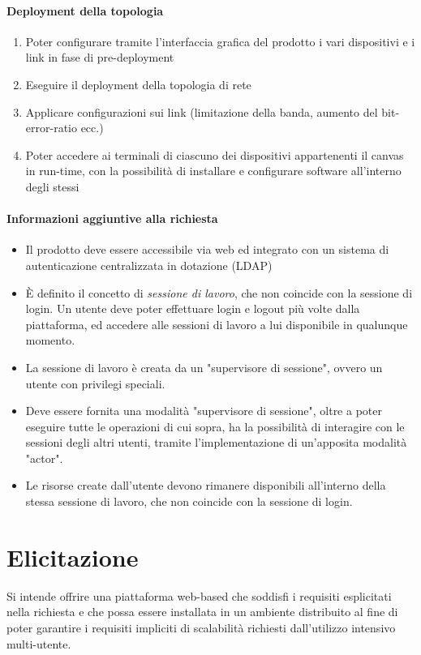 \documentclass[../main.tex]{subfiles}
\begin{document}
\paragraph{Deployment della topologia}
\begin{enumerate}
    \item Poter configurare tramite l'interfaccia grafica del prodotto i vari dispositivi e i link in fase di pre-deployment
    \item Eseguire il deployment della topologia di rete
    \item Applicare configurazioni sui link (limitazione della banda, aumento del bit-error-ratio ecc.)
    \item Poter accedere ai terminali di ciascuno dei dispositivi appartenenti il canvas in run-time, con la possibilità di installare e configurare software all'interno degli stessi

\end{enumerate}
\paragraph{Informazioni aggiuntive alla richiesta}
\begin{itemize}
    \item Il prodotto deve essere accessibile via web ed integrato con un sistema di autenticazione centralizzata in dotazione (LDAP)
    \item È definito il concetto di \textit{sessione di lavoro}, che non coincide con la sessione di login. Un utente deve poter effettuare login e logout più volte dalla piattaforma, ed accedere alle sessioni di lavoro a lui disponibile in qualunque momento.
    \item La sessione di lavoro è creata da un "supervisore di sessione", ovvero un utente con privilegi speciali.
    \item Deve essere fornita una modalità "supervisore di sessione", oltre a poter eseguire tutte le operazioni di cui sopra, ha la possibilità di interagire con le sessioni degli altri utenti, tramite l'implementazione di un'apposita modalità "actor".
    \item Le risorse create dall'utente devono rimanere disponibili all'interno della stessa sessione di lavoro, che non coincide con la sessione di login.
\end{itemize}

\section{Elicitazione}
Si intende offrire una piattaforma web-based che soddisfi i requisiti esplicitati nella richiesta e che possa essere installata in un ambiente distribuito al fine di poter garantire i requisiti impliciti di scalabilità richiesti dall'utilizzo intensivo multi-utente.
\end{document}
